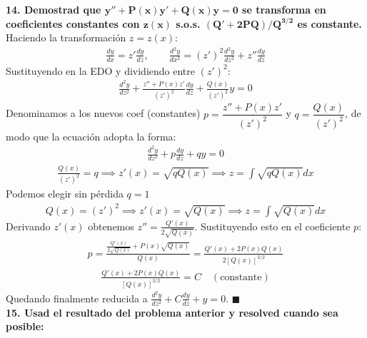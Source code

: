 \documentclass[11pt, a4paper]{article}
\begin{document}
\noindent\textbf{14. Demostrad que $\bm{y''+P(x)y'+Q(x)y=0}$ se transforma en coeficientes constantes con $\bm{z(x)}$ s.o.s. $\bm{(Q'+2PQ)/Q^{3/2}}$ es constante.} \\
Haciendo la transformación $z = z(x)$:
\begin{align*}
\frac{dy}{dx} = z' \frac{dy}{dz}, \qquad \frac{d^2y}{dx^2} = (z')^2 \frac{d^2y}{dz^2} + z'' \frac{dy}{dz}
\end{align*}
Sustituyendo en la EDO y dividiendo entre $(z')^2$:
\begin{align*}
\frac{d^2y}{dz^2} + \frac{z'' + P(x)z'}{(z')^2} \frac{dy}{dz} + \frac{Q(x)}{(z')^2} y = 0
\end{align*}
Denominamos a los nuevos coef (constantes) $p = \dfrac{z'' + P(x)z'}{(z')^2}$ y $q = \dfrac{Q(x)}{(z')^2}$, de modo que la ecuación adopta la forma:
\begin{align*}
\frac{d^2y}{dz^2} + p\frac{dy}{dz} + qy = 0
\end{align*}
\begin{align*}
\frac{Q(x)}{(z')^2} = q \implies z'(x) = \sqrt{q Q(x)} \implies z = \int \sqrt{qQ(x)} dx
\end{align*}
Podemos elegir sin pérdida $q= 1$
\begin{align*}
Q(x) = (z')^2 \implies z'(x) = \sqrt{Q(x)} \implies z = \int \sqrt{Q(x)} dx
\end{align*}
Derivando $z'(x)$ obtenemos $z'' = \frac{Q'(x)}{2\sqrt{Q(x)}}$. Sustituyendo esto en el coeficiente $p$:
\begin{align*}
p = \frac{\frac{Q'(x)}{2\sqrt{Q(x)}} + P(x)\sqrt{Q(x)}}{Q(x)} = \frac{Q'(x) + 2P(x)Q(x)}{2[Q(x)]^{3/2}}
\end{align*}
\begin{align*}
\frac{Q'(x) + 2P(x)Q(x)}{[Q(x)]^{3/2}} = C \quad (\text{constante})
\end{align*}
Quedando finalmente reducida a $\frac{d^2y}{dz^2} + C \frac{dy}{dz} + y = 0$. \qquad $\blacksquare$ \\

\noindent\textbf{15. Usad el resultado del problema anterior y resolved cuando sea posible:}
\end{document}
